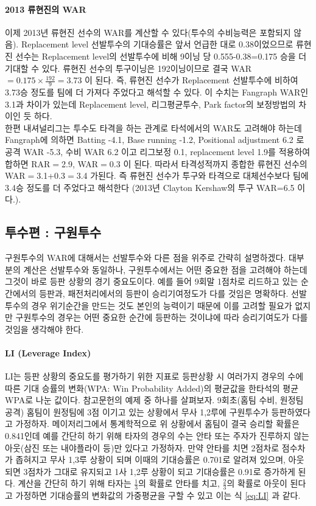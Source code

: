 \documentclass[11pt]{article}
\begin{document}
\paragraph{2013 류현진의 WAR}
이제 2013년 류현진 선수의 WAR를 계산할 수 있다(투수의 수비능력은 포함되지 않음). Replacement level 선발투수의 기대승률은 앞서 언급한 대로 0.38이었으므로 류현진 선수는 Replacement level의 선발투수에 비해 9이닝 당 0.555-0.38=0.175 승을 더 기대할 수 있다. 류현진 선수의 투구이닝은 192이닝이므로 결국 
WAR$=0.175 \times \frac{192}{9}=3.73$ 이 된다. 즉, 류현진 선수가 Replacement 선발투수에 비하여 3.73승 정도를 팀에 더 가져다 주었다고 해석할 수 있다. 이 수치는 Fangraph WAR인 3.1과 차이가 있는데 Replacement level, 리그평균투수, Park factor의 보정방법의 차이인 듯 하다.\\
한편 내셔널리그는 투수도 타격을 하는 관계로 타석에서의 WAR도 고려해야 하는데 Fangraph에 의하면 Batting -4.1, Base running -1.2, Positional adjustment 6.2 로 공격 WAR -5.3, 수비 WAR 6.2 이고 리그보정 0.1, replacement level 1.9를 적용하여 합하면 RAR$=$2.9, WAR$=$0.3 이 된다. 따라서 타격성적까지 종합한 류현진 선수의 WAR$=$3.1+0.3$=$3.4 가된다. 즉 류현진 선수가 투구와 타격으로 대체선수보다 팀에 3.4승 정도를 더 주었다고 해석한다 (2013년 Clayton Kershaw의 투구 WAR=6.5 이다.).

\subsection{투수편 : 구원투수}
구원투수의 WAR에 대해서는 선발투수와 다른 점을 위주로 간략히 설명하겠다. 대부분의 계산은 선발투수와 동일하나, 구원투수에서는 어떤 중요한 점을 고려해야 하는데 그것이 바로 등판 상황의 경기 중요도이다. 예를 들어 9회말 1점차로 리드하고 있는 순간에서의 등판과, 패전처리에서의 등판이 승리기여정도가 다를 것임은 명확하다. 선발투수의 경우 위기순간을 만드는 것도 본인의 능력이기 때문에 이를 고려할 필요가 없지만 구원투수의 경우는 어떤 중요한 순간에 등판하는 것이냐에 따라 승리기여도가 다를 것임을 생각해야 한다. 

\paragraph{LI (Leverage Index)}
LI는 등판 상황의 중요도를 평가하기 위한 지표로 등판상황 시 여러가지 경우의 수에 따른 기대 승률의 변화(WPA: Win Probability Added)의 평균값을 한타석의 평균 WPA로 나눈 값이다\cite{Li_tango}. 참고문헌의 예제 중 하나를 살펴보자. 9회초(홈팀 수비, 원정팀 공격) 홈팀이 원정팀에 3점 이기고 있는 상황에서 무사 1,2루에 구원투수가 등판하였다고 가정하자. 메이저리그에서 통계학적으로 위 상황에서 홈팀이 결국 승리할 확률은 0.841인데 예를 간단히 하기 위해 타자의 경우의 수는 안타 또는 주자가 진루하지 않는 아웃(삼진 또는 내야플라이 등)만 있다고 가정하자. 만약 안타를 치면 2점차로 점수차가 좁혀지고 무사 1,3루 상황이 되며 이때의 기대승률은 0.701로 알려져 있으며, 아웃되면 3점차가 그대로 유지되고 1사 1,2루 상황이 되고 기대승률은 0.91로 증가하게 된다. 계산을 간단히 하기 위해 타자는 $\frac{1}{3}$의 확률로 안타를 치고, $\frac{2}{3}$의 확률로 아웃이 된다고 가정하면 기대승률의 변화값의 가중평균을 구할 수 있고 이는 식 \ref{eq:LI} 과 같다. 
\end{document}
